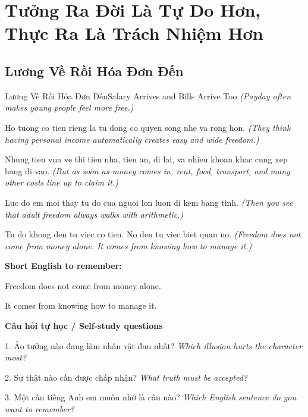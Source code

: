 \chapter{Tưởng Ra Đời Là Tự Do Hơn, Thực Ra Là Trách Nhiệm Hơn}

\section{Lương Về Rồi Hóa Đơn Đến}
\begin{truyen}{Lương Về Rồi Hóa Đơn Đến}{Salary Arrives and Bills Arrive Too}
\textit{(Payday often makes young people feel more free.)}

Ho tuong co tien rieng la tu dong co quyen song nhe va rong hon.
\textit{(They think having personal income automatically creates easy and wide freedom.)}

Nhung tien vua ve thi tien nha, tien an, di lai, va nhieu khoan khac cung xep hang di vao.
\textit{(But as soon as money comes in, rent, food, transport, and many other costs line up to claim it.)}

Luc do em moi thay tu do cua nguoi lon luon di kem bang tinh.
\textit{(Then you see that adult freedom always walks with arithmetic.)}

\end{truyen}

\begin{baihoc}
Tu do khong den tu viec co tien. No den tu viec biet quan no.
\textit{(Freedom does not come from money alone. It comes from knowing how to manage it.)}
\end{baihoc}

\begin{ghinhoanh}
\textbf{Short English to remember:}

Freedom does not come from money alone.

It comes from knowing how to manage it.

\end{ghinhoanh}

\begin{tuhocnhanh}
\textbf{Câu hỏi tự học / Self-study questions}

1. Ảo tưởng nào đang làm nhân vật đau nhất? \textit{Which illusion hurts the character most?}

2. Sự thật nào cần được chấp nhận? \textit{What truth must be accepted?}

3. Một câu tiếng Anh em muốn nhớ là câu nào? \textit{Which English sentence do you want to remember?}
\end{tuhocnhanh}
\ngancach

